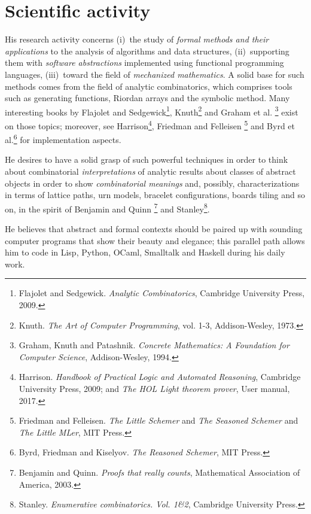 \documentclass[a4paper]{article} %
\begin{document}
    \section{Scientific activity}
    
    His research activity concerns (i)~the study of \textit{formal methods
    and their applications} to the analysis of algorithms and data structures,
    (ii)~supporting them with \textit{software abstractions} implemented using functional
    programming languages, (iii)~toward the field of \textit{mechanized mathematics}.  
    A solid base for such methods comes from the field
    of analytic combinatorics, which comprises tools such as generating
    functions, Riordan arrays and the symbolic method. Many interesting books
    by Flajolet and Sedgewick\footnote{Flajolet and Sedgewick.
    \emph{Analytic Combinatorics}, Cambridge University Press, 2009.},
    Knuth\footnote{Knuth. \emph{The Art of Computer Programming}, vol.  1-3,
    Addison-Wesley, 1973.} and Graham et al. \footnote{Graham, Knuth and
    Patashnik. \emph{Concrete Mathematics: A Foundation for Computer Science},
    Addison-Wesley, 1994.} exist on those topics; moreover,  see
    Harrison\footnote{Harrison. \textit{Handbook of Practical Logic and
    Automated Reasoning}, Cambridge University Press, 2009; and \textit{The HOL
    Light theorem prover}, User manual, 2017.}, Friedman and Felleisen
    \footnote{Friedman and Felleisen. \textit{The Little Schemer} and
    \textit{The Seasoned Schemer} and \textit{The Little MLer}, MIT Press.} and
    Byrd et al.\footnote{Byrd, Friedman and Kiselyov. \textit{The Reasoned
    Schemer}, MIT Press.} for implementation aspects. 

    He desires to have a solid grasp of such powerful techniques in order to
    think about combinatorial \emph{interpretations} of
    analytic results about classes of abstract objects in order to show
    \emph{combinatorial meanings} and, possibly, characterizations in terms
    of lattice paths, urn models, bracelet configurations, boards
    tiling and so on, in the spirit of Benjamin and Quinn \footnote{Benjamin
    and Quinn. \emph{Proofs that really counts}, Mathematical Association of
    America, 2003.} and Stanley\footnote{Stanley. \emph{Enumerative
    combinatorics. {V}ol. 1\&2}, Cambridge University Press.}.

    He believes that abstract and formal contexts should be paired up with
    sounding computer programs that show their beauty and elegance; this
    parallel path allows him to code in Lisp, Python, OCaml, Smalltalk and
    Haskell during his daily work.
\end{document}
